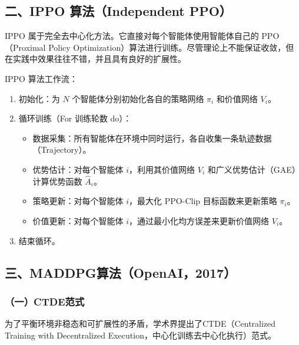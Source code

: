 \hypertarget{ux4e8cippo-ux7b97ux6cd5independent-ppo}{%
\subsection{二、IPPO 算法（Independent PPO）}\label{ux4e8cippo-ux7b97ux6cd5independent-ppo}}

IPPO 属于完全去中心化方法。它直接对每个智能体使用智能体自己的 PPO（Proximal Policy Optimization）算法进行训练。尽管理论上不能保证收敛，但在实践中效果往往不错，并且具有良好的扩展性。

IPPO 算法工作流：

\begin{enumerate}
\def\labelenumi{\arabic{enumi}.}
\tightlist
\item
  初始化：为 \(N\) 个智能体分别初始化各自的策略网络 \(\pi_i\) 和价值网络 \(V_i\)。
\item
{}
  循环训练（For 训练轮数 do）：

  \begin{itemize}
  \tightlist
  \item
    数据采集：所有智能体在环境中同时运行，各自收集一条轨迹数据（Trajectory）。
  \item
    优势估计：对每个智能体 \(i\)，利用其价值网络 \(V_i\) 和广义优势估计（GAE）计算优势函数 \(\hat{A}_i\)。
  \item
    策略更新：对每个智能体 \(i\)，最大化 PPO-Clip 目标函数来更新策略 \(\pi_i\)。
  \item
    价值更新：对每个智能体 \(i\)，通过最小化均方误差来更新价值网络 \(V_i\)。
  \end{itemize}
\item
  结束循环。
\end{enumerate}

\hypertarget{ux4e09maddpgux7b97ux6cd5openai2017}{%
\subsection{三、MADDPG算法（OpenAI，2017）}\label{ux4e09maddpgux7b97ux6cd5openai2017}}

\hypertarget{ux4e00ctdeux8303ux5f0f}{%
\subsubsection{（一）CTDE范式}\label{ux4e00ctdeux8303ux5f0f}}

为了平衡环境非稳态和可扩展性的矛盾，学术界提出了CTDE（Centralized Training with Decentralized Execution，中心化训练去中心化执行）范式。

